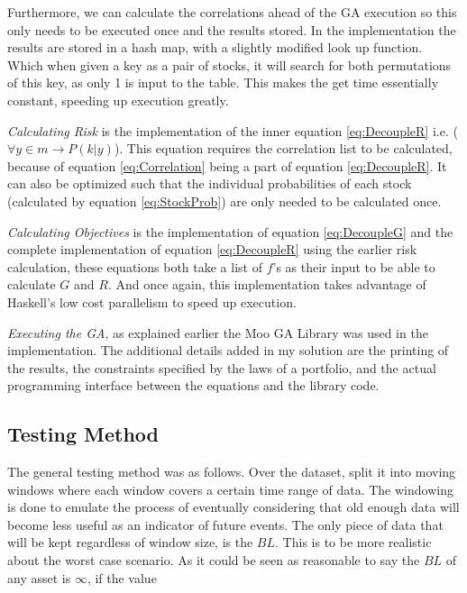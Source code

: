 \documentclass[11pt]{article}
\begin{document}
    Furthermore, we can calculate the correlations ahead of the GA execution so this only needs to be
    executed once and the results stored. In the implementation the results are stored in a hash map,
    with a slightly modified look up function. Which when given a key as a pair of stocks, it will
    search for both permutations of this key, as only 1 is input to the table. This makes the
    get time essentially constant, speeding up execution greatly.

    \textit{Calculating Risk} is the implementation of the inner equation \ref{eq:DecoupleR} 
    i.e. (\(\forall y \in m \to P(k|y)\)). This equation
    requires the correlation list to be calculated, because of equation \ref{eq:Correlation} being a
    part of equation \ref{eq:DecoupleR}. It can also be optimized such that the individual
    probabilities of each stock (calculated by equation \ref{eq:StockProb}) are only needed to be
    calculated once.

    \textit{Calculating Objectives} is the implementation of equation \ref{eq:DecoupleG} and the complete
    implementation of equation \ref{eq:DecoupleR} using the earlier risk calculation, these
    equations both take a list of \(f\)'s as their input to be able to calculate \(G\) and \(R\).
    And once again, this implementation takes advantage of Haskell's low cost parallelism to speed
    up execution.

    \textit{Executing the GA}, as explained earlier the Moo GA Library \cite{Moo} was used in
    the implementation. The additional details added in my solution are the printing of the results,
    the constraints specified by the laws of a portfolio, and the actual programming interface
    between the equations and the library code.

\subsection{Testing Method}

    The general testing method was as follows. Over the dataset, split it into moving windows
    where each window covers a certain time range of data. The windowing is done to emulate
    the process of eventually considering that old enough data will become less useful
    as an indicator of future events. The only piece of data that will be kept regardless
    of window size, is the \(BL\). This is to be more realistic about the worst case scenario.
    As it could be seen as reasonable to say the \(BL\) of any asset is \(\infty\), if
    the value
\end{document}

